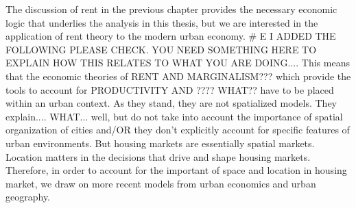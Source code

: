 




The discussion of rent in the previous chapter provides the necessary economic logic
that underlies the analysis in this thesis, but we are interested in the application of rent theory to the modern urban economy. \# E I ADDED THE FOLLOWING PLEASE CHECK. YOU NEED SOMETHING HERE TO EXPLAIN HOW THIS RELATES TO WHAT YOU ARE DOING.... This means that the economic theories of RENT AND MARGINALISM??? which provide the tools to account for PRODUCTIVITY AND ???? WHAT?? have to be placed within an urban context. As they stand, they are not spatialized models. They explain.... WHAT... well, but do not take into account the importance of  spatial organization of cities and/OR they don't explicitly account for specific features of urban environments. But housing markets are essentially spatial markets. Location matters in the decisions that drive and shape housing markets. Therefore, in order to account for the important of space and location in housing market, we draw on more recent models from urban economics and urban geography. 


